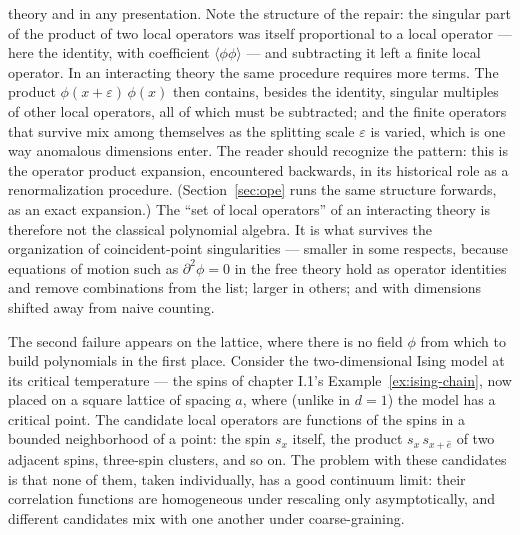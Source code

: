 theory and in any presentation. Note the structure of the repair: the
singular part of the product of two local operators was itself proportional
to a local operator --- here the identity, with coefficient
$\langle\phi\phi\rangle$ --- and subtracting it left a finite local operator.
In an interacting theory the same procedure requires more terms. The product
$\phi(x+\varepsilon)\,\phi(x)$ then contains, besides the identity, singular
multiples of other local operators, all of which must be subtracted; and the
finite operators that survive mix among themselves as the splitting scale
$\varepsilon$ is varied, which is one way anomalous dimensions enter. The
reader should recognize the pattern: this is the operator product expansion,
encountered backwards, in its historical role as a renormalization
procedure. (Section~\ref{sec:ope} runs the same structure forwards, as an
exact expansion.) The ``set of local operators'' of an interacting theory is
therefore not the classical polynomial algebra. It is what survives the
organization of coincident-point singularities --- smaller in some respects,
because equations of motion such as $\partial^2 \phi = 0$ in the free theory
hold as operator identities and remove combinations from the list; larger in
others; and with dimensions shifted away from naive counting.

The second failure appears on the lattice, where there is no field $\phi$
from which to build polynomials in the first place. Consider the
two-dimensional Ising model at its critical temperature --- the spins of
chapter I.1's Example~\ref{ex:ising-chain}, now placed on a square lattice of
spacing $a$, where (unlike in $d = 1$) the model has a critical
point. The candidate local operators are functions of the spins in a bounded
neighborhood of a point: the spin $s_x$ itself, the product $s_x\, s_{x +
\hat e}$ of two adjacent spins, three-spin clusters, and so on. The problem
with these candidates is that none of them, taken individually, has a good
continuum limit: their correlation functions are homogeneous under rescaling
only asymptotically, and different candidates mix with one another under
coarse-graining.

